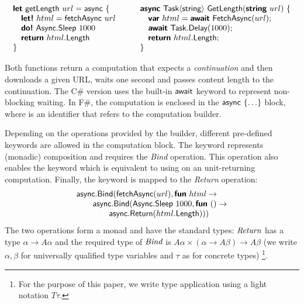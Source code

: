 \documentclass[runningheads,a4paper]{llncs}
\begin{document}
\begin{equation*}
\begin{array}{l}
\kvd{let}~\ident{getLength}~url=\ident{async}~\{\\
\quad \kvd{let!}~html = \ident{fetchAsync}~url\\
\quad \kvd{do!}~\ident{Async}.\ident{Sleep}~1000\\
\quad \kvd{return}~html.\ident{Length}\\
\}
\end{array}\qquad
\begin{array}{l}
\kvd{async}~\ident{Task}\langle\ident{string}\rangle~\ident{GetLength}(\kvd{string}~url)~\{\\
\quad \kvd{var}~html = \kvd{await}~\ident{FetchAsync}(url);\\
\quad \kvd{await}~\ident{Task}.\ident{Delay}(1000);\\
\quad \kvd{return}~html.\ident{Length};\\
\}
\end{array}
\end{equation*}

Both functions return a computation that expects a \emph{continuation} and then downloads a given 
URL, waits one second and passes content length to the continuation. The C\# version uses the built-in
$\textnormal{\sffamily await}$ keyword to represent non-blocking waiting. In F\#, the computation is enclosed
in the $\textnormal{\sffamily async}~\{ \ldots \}$ block, where  is an identifier that refers to
the computation builder. 

Depending on the operations provided by the builder, different pre-defined keywords are allowed
in the computation block. The  keyword represents (monadic) composition and requires 
the \emph{Bind} operation. This operation also enables the  keyword which is equivalent 
to using  on an unit-returning computation. Finally, the  keyword is 
mapped to the \emph{Return} operation:
%
\begin{equation*}
\begin{array}{l}
\textnormal{\sffamily async}.\textnormal{\sffamily Bind}(\textnormal{\sffamily fetchAsync}(url), \textnormal{\bfseries\sffamily fun}~html\rightarrow\\
\qquad \textnormal{\sffamily async}.\textnormal{\sffamily Bind}(\textnormal{\sffamily Async}.\textnormal{\sffamily Sleep}~1000, \textnormal{\bfseries\sffamily fun}~()\rightarrow\\
\qquad\qquad \textnormal{\sffamily async}.\textnormal{\sffamily Return}(html.\textnormal{\sffamily Length})))
\end{array}
\end{equation*}
%
The two operations form a monad and have the standard types: $\emph{Return}$ has a type $\alpha \rightarrow A\alpha$ 
and the required type of $\emph{Bind}$ is $A\alpha \times (\alpha \rightarrow A\beta) \rightarrow A\beta$ 
(we write $\alpha, \beta$ for universally qualified type variables and $\tau$ as for concrete types)
\footnote{For the purpose of this paper, we write type application using a light notation $T\tau$. }.
\end{document}

